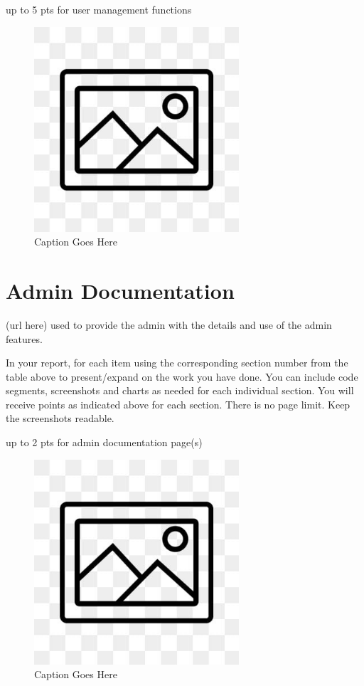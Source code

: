 \documentclass[12pt, letterpaper]{article}
\begin{document}
up to 5 pts for user management functions

\begin{figure}[htbp]
	\centering
	\includegraphics[width=3in]{images/placeholder.jpg}
	\caption{Caption Goes Here}
 \end{figure}

 \newpage

\section{Admin Documentation}
(url here) used to provide the admin with the details and use of the admin features.

In your report, for each item using the corresponding section number from the table above to present/expand on the work you have done. You can include code segments, screenshots and charts as needed for each individual section. You will receive points as indicated above for each section. There is no page limit. Keep the screenshots readable.

up to 2 pts for admin documentation page(s)

\begin{figure}[htbp]
	\centering
	\includegraphics[width=3in]{images/placeholder.jpg}
	\caption{Caption Goes Here}
 \end{figure}
\end{document}
